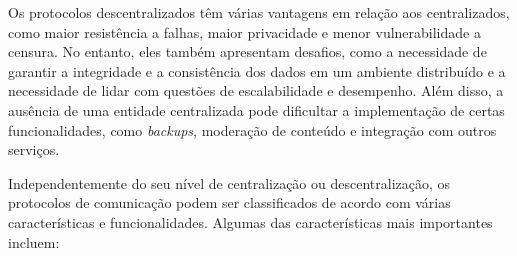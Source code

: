 
Os protocolos descentralizados têm várias vantagens em relação aos centralizados, como maior resistência a falhas, maior privacidade e menor vulnerabilidade a censura. No entanto, eles também apresentam desafios, como a necessidade de garantir a integridade e a consistência dos dados em um ambiente distribuído e a necessidade de lidar com questões de escalabilidade e desempenho. Além disso, a ausência de uma entidade centralizada pode dificultar a implementação de certas funcionalidades, como \textit{backups}, moderação de conteúdo e integração com outros serviços.

Independentemente do seu nível de centralização ou descentralização, os protocolos de comunicação podem ser classificados de acordo com várias características e funcionalidades. Algumas das características mais importantes incluem:

